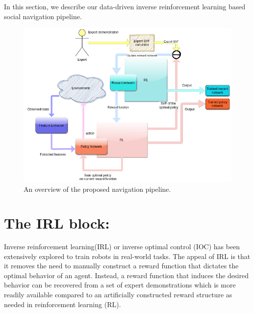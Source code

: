 \label{Ch:4}
In this section, we describe our data-driven inverse reinforcement learning based social navigation pipeline.\\

\begin{figure}[!htbp]
	\centering
	\includegraphics[width=\linewidth]{figures/irl_pipeline.png}
	\caption{An overview of the proposed navigation pipeline. }
	\label{fig:irl_pipeline}
\end{figure}

\section{The IRL block:}
Inverse reinforcement learning(IRL) or inverse optimal control (IOC) has been extensively explored to train robots in real-world tasks. The appeal of IRL is that it removes the need to manually construct a reward function that dictates the optimal behavior of an agent. Instead, a reward function that induces the desired behavior can be recovered from a set of expert demonstrations which is more readily available compared to an artificially constructed reward structure as needed in reinforcement learning (RL).

